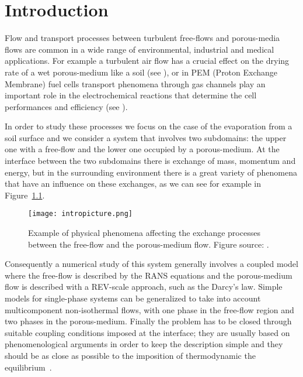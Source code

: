 \chapter{Introduction}
Flow and transport processes between turbulent free-flows and porous-media 
flows 
are common in a wide range of environmental, industrial and medical 
applications. For example a turbulent air flow has a crucial effect on the 
drying rate of a wet porous-medium like a soil (see \cite{paper:fetzer}), or 
in PEM (Proton Exchange Membrane) fuel cells transport phenomena through gas 
channels play an important 
role in the electrochemical reactions that determine the cell performances and 
efficiency (see \cite{wu:fuelcell}).

In order to study these processes we focus on the case of the evaporation from 
a soil surface and we consider a system that involves two subdomains: the upper 
one with a free-flow and the lower one occupied by a porous-medium. At the 
interface between the two subdomains there is exchange of mass, momentum and 
energy, but in the surrounding environment there is a great variety of 
phenomena that have an influence on these exchanges, as we can see for example 
in Figure~\ref{fig:intro}.
\begin{figure}[ht]
	\centering
	\texttt{[image: intropicture.png]}
	\caption[Exchange processes between free and porous-medium 
	flows]{Example of physical phenomena affecting the exchange processes 
	between the free-flow and the porous-medium flow. Figure source: 
	\cite{tesi:fetzer}.}
	\label{fig:intro}
\end{figure}
Consequently a numerical study of this system generally involves a coupled 
model where the free-flow is described by the RANS equations and the 
porous-medium flow is described with a REV-scale approach, such as the Darcy's 
law. 
Simple models for single-phase systems can be generalized to take 
into account multicomponent non-isothermal flows, with one phase in the 
free-flow region and two phases in the porous-medium. Finally the problem 
has to be closed through suitable coupling conditions imposed at the 
interface; they are usually based on phenomenological arguments in order to 
keep the description simple and they should be as close as possible to the 
imposition of thermodynamic the equilibrium~\cite{paper:mosthaf}.

